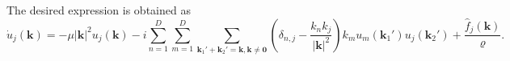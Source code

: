 \documentclass[a4paper,11pt,fleqn]{article}
\begin{document}
The desired expression is obtained as 
\begin{equation}
    \dot{u}_j({\bm k}) = -\mu|{\bm k}|^2 u_j({\bm k}) - i\sum_{n=1}^D \sum_{m=1}^D \sum_{{\bm k}_1'+{\bm k}_2' = {\bm k}, {\bm k}\neq {\bm 0}} \left(\delta_{n,j} - \frac{k_n k_j}{|{\bm k}|^2} \right)  k_m u_m({\bm k}_1')u_j({\bm k}_2')+\frac{\hat{f}_j({\bm k})}{\varrho}.
\end{equation}
\end{document}
